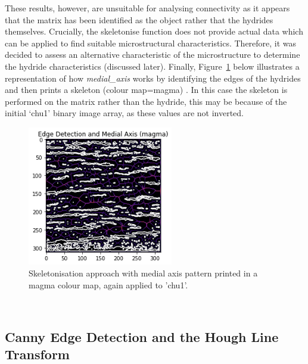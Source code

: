 \documentclass{article}
\begin{document}
	\noindent These results, however, are unsuitable for analysing connectivity as it appears that the matrix has been identified as the object rather that the hydrides themselves. Crucially, the skeletonise function does not provide actual data which can be applied to find suitable microstructural characteristics. Therefore, it was decided to assess an alternative characteristic of the microstructure to determine the hydride characteristics (discussed later). Finally, Figure~\ref{MedialAxis} below illustrates a representation of how \textit{medial\_axis} works by identifying the edges of the hydrides and then prints a skeleton (colour map=magma) \cite{ScikitimageA}. In this case the skeleton is performed on the matrix rather than the hydride, this may be because of the initial ‘chu1’ binary image array, as these values are not inverted.
	\\
	\begin{figure}[h]
		\centering
		\includegraphics[width=2.5in]{Figures/Medial_Axis_Chu1} 
		\caption{Skeletonisation approach with medial axis pattern printed in a magma colour map, again applied to 'chu1'.}
		\label{MedialAxis}
	\end{figure}
	\\
	\subsection{Canny Edge Detection and the Hough Line Transform}
	
\end{document}
